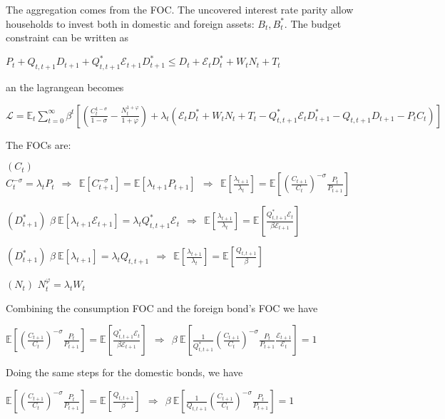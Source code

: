 \documentclass[
]{article}
\begin{document}
The aggregation comes from the FOC. The uncovered interest rate parity
allow households to invest both in domestic and foreign assets:
\(B_t, B_t^*\). The budget constraint can be written as

\(P_t + Q_{t,t+1}D_{t+1}+Q_{t,t+1}^*\mathcal{E}_{t+1}D_{t+1}^* \leq D_t+\mathcal{E}_{t}D_t^*+W_tN_t+T_t\)

an the lagrangean becomes

\(\mathcal{L} = \displaystyle \mathbb{E}_t \sum_{t=0}^\infty \beta^t \left[ \left( \frac{C_t^{1-\sigma}}{1-\sigma}-\frac{N_t^{1+\varphi}}{1+\varphi} \right) + \lambda_t \left(\mathcal{E}_t D_t^* + W_tN_t + T_t - Q_{t,t+1}^*\mathcal{E}_t D_{t+1}^* - Q_{t,t+1}D_{t+1} - P_t C_t \right) \right]\)

The FOCs are:

\((C_t)\)
\(\displaystyle C_t^{-\sigma} = \lambda_tP_t \ \ \Rightarrow \ \ \mathbb{E}[C_{t+1}^{-\sigma}] = \mathbb{E}[\lambda_{t+1}P_{t+1}] \ \ \Rightarrow \ \ \displaystyle \mathbb{E}\left[ \frac{\lambda_{t+1}}{\lambda_t}\right] = \mathbb{E}\left[ \left( \frac{C_{t+1}}{C_t} \right)^{-\sigma}\frac{P_t}{P_{t+1}}\right]\)

\((D_{t+1}^*)\)
\(\beta \ \mathbb{E}[\lambda_{t+1} \mathcal{E}_{t+1}] = \lambda_t Q_{t,t+1}^* \mathcal{E}_t \ \ \Rightarrow \ \ \displaystyle \mathbb{E}\left[ \frac{\lambda_{t+1}}{\lambda_t}\right] = \mathbb{E}\left[ \frac{Q_{t,t+1}^*\mathcal{E}_t}{\beta \mathcal{E}_{t+1}}\right]\)

\((D_{t+1}^*)\)
\(\beta \ \mathbb{E}[\lambda_{t+1} ] = \lambda_t Q_{t,t+1}\ \ \Rightarrow \ \ \displaystyle \mathbb{E}\left[ \frac{\lambda_{t+1}}{\lambda_t}\right] = \mathbb{E}\left[ \frac{Q_{t,t+1}}{\beta }\right]\)

\((N_t)\) \(N_t^\varphi=\lambda_t W_t\)

Combining the consumption FOC and the foreign bond's FOC we have

\(\displaystyle \mathbb{E}\left[ \left( \frac{C_{t+1}}{C_t} \right)^{-\sigma}\frac{P_t}{P_{t+1}}\right] = \mathbb{E}\left[ \frac{Q_{t,t+1}^*\mathcal{E}_t}{\beta \mathcal{E}_{t+1}}\right] \ \ \Rightarrow \ \ \beta \  \displaystyle \mathbb{E}\left[ \frac{1}{Q_{t,t+1}^*} \left( \frac{C_{t+1}}{C_t} \right)^{-\sigma}\frac{P_t}{P_{t+1}} \frac{\mathcal{E}_{t+1}}{\mathcal{E}_{t}} \right]=1\)

Doing the same steps for the domestic bonds, we have

\(\displaystyle \mathbb{E}\left[ \left( \frac{C_{t+1}}{C_t} \right)^{-\sigma}\frac{P_t}{P_{t+1}}\right] = \mathbb{E}\left[ \frac{Q_{t,t+1}}{\beta }\right] \ \ \Rightarrow \ \ \beta \  \displaystyle \mathbb{E}\left[ \frac{1}{Q_{t,t+1}} \left( \frac{C_{t+1}}{C_t} \right)^{-\sigma}\frac{P_t}{P_{t+1}} \right]=1\)
\end{document}
